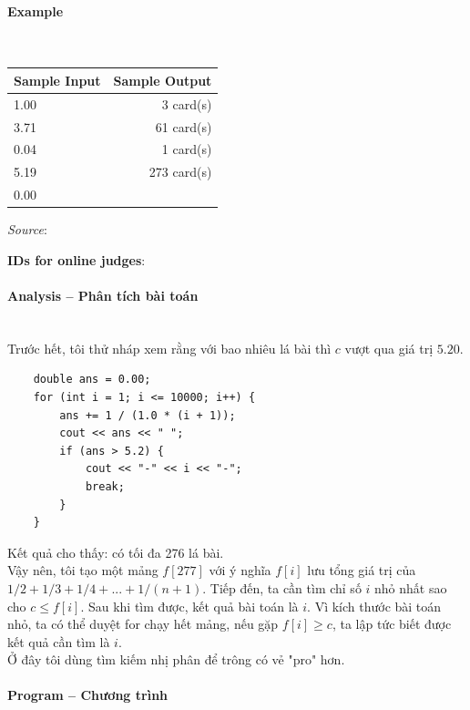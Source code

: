 \documentclass{article}
\begin{document}
\paragraph{Example}\mbox{} \\

\begin{table}[h]
    \centering
    \begin{tabular}{|l|r|}
        \hline
        \textbf{Sample Input} & \textbf{Sample Output} \\
        \hline
         1.00  & 3 card(s)  \\ 
         3.71  & 61 card(s) \\ 
         0.04  & 1 card(s) \\ 
         5.19  & 273 card(s) \\ 
         0.00 & \\ \hline
    \end{tabular}
\end{table}

\textit{Source}: 

\textbf{IDs for online judges}: 


\paragraph{Analysis -- Phân tích bài toán} \mbox{} \\

Trước hết, tôi thử nháp xem rằng với bao nhiêu lá bài thì $c$ vượt qua giá trị $5.20$.

\begin{lstlisting}
	double ans = 0.00;
	for (int i = 1; i <= 10000; i++) {
		ans += 1 / (1.0 * (i + 1));
		cout << ans << " ";
		if (ans > 5.2) {
			cout << "-" << i << "-";
			break;
		}
	}
\end{lstlisting}

Kết quả cho thấy: có tối đa 276 lá bài. \\

Vậy nên, tôi tạo một mảng $f[277]$ với ý nghĩa $f[i]$ lưu tổng giá trị của $1/2 + 1/3 + 1/4 + . . . + 1/(n + 1)$. Tiếp đến, ta cần tìm chỉ số $i$ nhỏ nhất sao cho $c \leq f[i]$. Sau khi tìm được, kết quả bài toán là $i$. Vì kích thước bài toán nhỏ, ta có thể duyệt for chạy hết mảng, nếu gặp $f[i] \geq c$, ta lập tức biết được kết quả cần tìm là $i$.\\

Ở đây tôi dùng tìm kiếm nhị phân để trông có vẻ "pro" hơn.

\paragraph{Program -- Chương trình} \mbox{} \\
\end{document}

